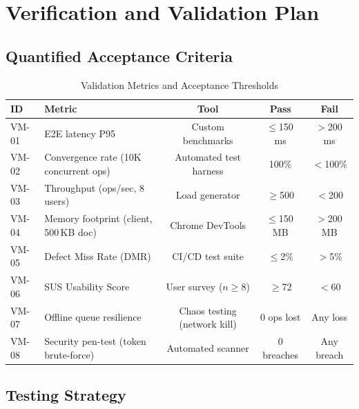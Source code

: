 \documentclass[12pt, a4paper, oneside]{article}
\begin{document}
\section{Verification and Validation Plan}

\subsection{Quantified Acceptance Criteria}

\begin{table}[H]
\centering
\caption{Validation Metrics and Acceptance Thresholds}
\begin{tabularx}{\textwidth}{l X c c c}
\toprule
\textbf{ID} & \textbf{Metric} & \textbf{Tool} & \textbf{Pass} & \textbf{Fail} \\
\midrule
VM-01 & E2E latency P95 & Custom benchmarks & $\leq$150\,ms & $>$200\,ms \\
VM-02 & Convergence rate (10K concurrent ops) & Automated test harness & 100\% & $<$100\% \\
VM-03 & Throughput (ops/sec, 8 users) & Load generator & $\geq$500 & $<$200 \\
VM-04 & Memory footprint (client, 500\,KB doc) & Chrome DevTools & $\leq$150\,MB & $>$200\,MB \\
VM-05 & Defect Miss Rate (DMR) & CI/CD test suite & $\leq$2\% & $>$5\% \\
VM-06 & SUS Usability Score & User survey ($n\geq 8$) & $\geq$72 & $<$60 \\
VM-07 & Offline queue resilience & Chaos testing (network kill) & 0 ops lost & Any loss \\
VM-08 & Security pen-test (token brute-force) & Automated scanner & 0 breaches & Any breach \\
\bottomrule
\end{tabularx}
\end{table}

\subsection{Testing Strategy}
\end{document}

